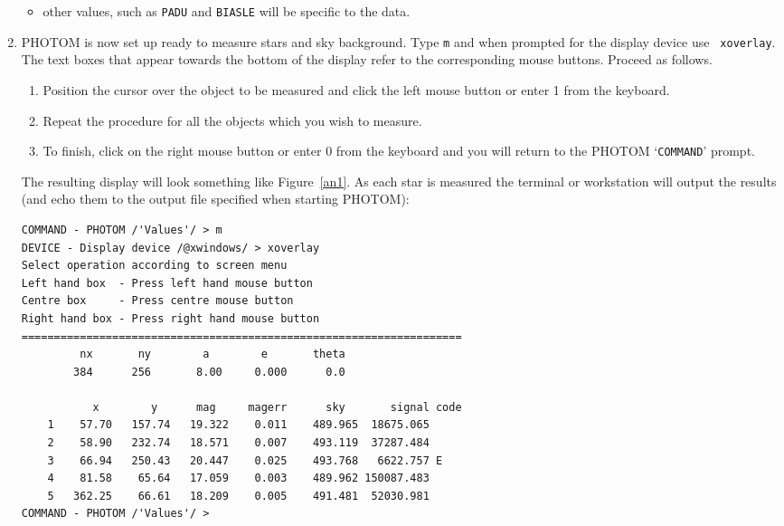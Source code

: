 \documentclass[twoside,11pt]{article}
\begin{document}
\begin{enumerate}
\begin{itemize}
    \item other values, such as {\tt PADU} and {\tt BIASLE} will be
     specific to the data.

  \end{itemize}

  \item PHOTOM is now set up ready to measure stars and sky background.
   Type {\tt m} and when prompted for the display device use {\tt
   xoverlay}.  The text boxes that appear towards the bottom of the
   display refer to the corresponding mouse buttons.  Proceed as
   follows.

  \begin{enumerate}

    \item Position the cursor over the object to be measured and
     click the left mouse button or enter 1 from the keyboard.

    \item Repeat the procedure for all the objects which you wish
     to measure.

    \item To finish, click on the right mouse button or enter 0 from
     the keyboard and you will return to the PHOTOM `{\tt COMMAND}'
     prompt.

  \end{enumerate}

   The resulting display will look something like Figure~\ref{an1}.
   As each star is measured the terminal or workstation will output the
   results (and echo them to the output file specified when starting
   PHOTOM):

{\samepage
\begin{verbatim}
COMMAND - PHOTOM /'Values'/ > m
DEVICE - Display device /@xwindows/ > xoverlay
Select operation according to screen menu
Left hand box  - Press left hand mouse button
Centre box     - Press centre mouse button
Right hand box - Press right hand mouse button
====================================================================
         nx       ny        a        e       theta
        384      256       8.00     0.000      0.0

           x        y      mag     magerr      sky       signal code
    1    57.70   157.74   19.322    0.011    489.965  18675.065
    2    58.90   232.74   18.571    0.007    493.119  37287.484
    3    66.94   250.43   20.447    0.025    493.768   6622.757 E
    4    81.58    65.64   17.059    0.003    489.962 150087.483
    5   362.25    66.61   18.209    0.005    491.481  52030.981
COMMAND - PHOTOM /'Values'/ >
\end{verbatim}
}


\end{enumerate}
\end{document}
